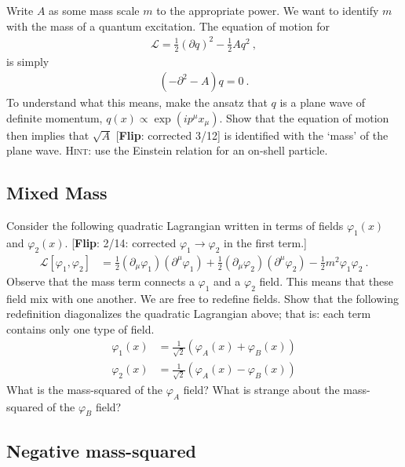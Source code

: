 \documentclass[12pt]{article}
\newcommand{\flip}[1]{{\color{red} [\textbf{Flip}: {#1}]}}
\begin{document}
Write $A$ as some mass scale $m$ to the appropriate power. We want to identify $m$ with the mass of a quantum excitation. The equation of motion for
\begin{align}
	\mathcal L = \frac 12\left(\partial q\right)^2 - \frac 12 A q^2 \ ,
\end{align}
is simply
\begin{align}
	(-\partial^2 - A) q = 0 \ .
\end{align}
To understand what this means, make the ansatz that $q$ is a plane wave of definite momentum, $q(x)\propto \exp(ip^\mu x_\mu)$. Show that the equation of motion then implies that $\sqrt{A}$ \flip{corrected 3/12} is identified with the `mass' of the plane wave. \textsc{Hint}: use the Einstein relation for an on-shell particle.



\subsection{Mixed Mass}

Consider the following quadratic Lagrangian written in terms of fields $\varphi_1(x)$ and $\varphi_2(x)$. \flip{2/14: corrected $\varphi_1 \to \varphi_2$ in the first term.}
\begin{align}
	\mathcal L[\varphi_1, \varphi_2] &=
	\frac{1}{2}\left(\partial_\mu\varphi_1\right)
	\left(\partial^\mu\varphi_1\right)
	+
	\frac{1}{2}\left(\partial_\mu\varphi_2\right)
	\left(\partial^\mu\varphi_2\right)
	- \frac 12 m^2\varphi_1\varphi_2 \ .
\end{align}
Observe that the mass term connects a $\varphi_1$ and a $\varphi_2$ field. This means that these field mix with one another. We are free to redefine fields. Show that the following redefinition diagonalizes the quadratic Lagrangian above; that is: each term contains only one type of field.
\begin{align}
	\varphi_1(x) &= \frac{1}{\sqrt{2}}\left(\varphi_A(x) + \varphi_B(x) \right)
	\\
	\varphi_2(x) &= \frac{1}{\sqrt{2}}\left(\varphi_A(x) - \varphi_B(x) \right)
\end{align}
What is the mass-squared of the $\varphi_A$ field? What is strange about the mass-squared of the $\varphi_B$ field?

\subsection{Negative mass-squared}
\end{document}

